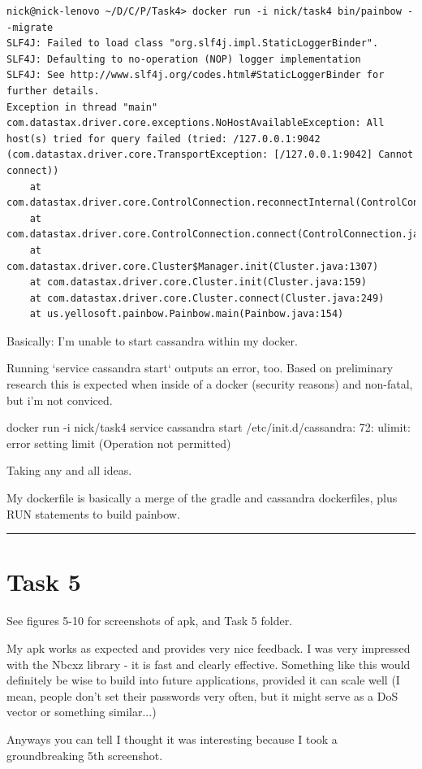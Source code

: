 \documentclass{article}
\begin{document}
\begin{verbatim}
nick@nick-lenovo ~/D/C/P/Task4> docker run -i nick/task4 bin/painbow --migrate
SLF4J: Failed to load class "org.slf4j.impl.StaticLoggerBinder".
SLF4J: Defaulting to no-operation (NOP) logger implementation
SLF4J: See http://www.slf4j.org/codes.html#StaticLoggerBinder for further details.
Exception in thread "main" com.datastax.driver.core.exceptions.NoHostAvailableException: All host(s) tried for query failed (tried: /127.0.0.1:9042 (com.datastax.driver.core.TransportException: [/127.0.0.1:9042] Cannot connect))
    at com.datastax.driver.core.ControlConnection.reconnectInternal(ControlConnection.java:227)
    at com.datastax.driver.core.ControlConnection.connect(ControlConnection.java:82)
    at com.datastax.driver.core.Cluster$Manager.init(Cluster.java:1307)
    at com.datastax.driver.core.Cluster.init(Cluster.java:159)
    at com.datastax.driver.core.Cluster.connect(Cluster.java:249)
    at us.yellosoft.painbow.Painbow.main(Painbow.java:154)

\end{verbatim}
Basically: I'm unable to start cassandra within my docker.

Running `service cassandra start` outputs an error, too. Based on preliminary research this is expected when inside of a docker (security reasons) and non-fatal, but i'm not conviced.

docker run -i nick/task4 service cassandra start
/etc/init.d/cassandra: 72: ulimit: error setting limit (Operation not permitted)

Taking any and all ideas.

My dockerfile is basically a merge of the gradle and cassandra dockerfiles, plus RUN statements to build painbow.
\hrule

\section{Task 5}
See figures 5-10 for screenshots of apk, and Task 5 folder.

My apk works as expected and provides very nice feedback. I was very impressed with the Nbcxz library - it is fast and clearly effective. Something like this would definitely be wise to build into future applications, provided it can scale well (I mean, people don't set their passwords very often, but it might serve as a DoS vector or something similar...)

Anyways you can tell I thought it was interesting because I took a groundbreaking 5th screenshot.
\end{document}
